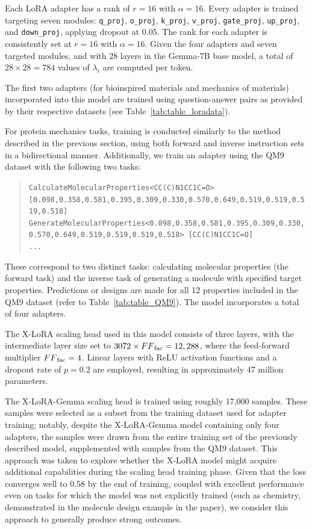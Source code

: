 Each LoRA adapter has a rank of $r=16$ with $\alpha=16$. Every adapter is trained targeting seven modules: \texttt{q\_proj}, \texttt{o\_proj}, \texttt{k\_proj}, \texttt{v\_proj}, \texttt{gate\_proj}, \texttt{up\_proj}, and \texttt{down\_proj}, applying dropout at 0.05. The rank for each adapter is consistently set at $r=16$ with $\alpha=16$. Given the four adapters and seven targeted modules, and with 28 layers in the Gemma-7B base model, a total of $28 \times 28 = 784$ values of $\lambda_i$ are computed per token.

The first two adapters (for bioinspired materials and mechanics of materials) incorporated into this model are trained using question-answer pairs as provided by their respective datasets (see Table~\ref{tab:table_loradata}).

For protein mechanics tasks, training is conducted similarly to the method described in the previous section, using both forward and inverse instruction sets in a bidirectional manner. Additionally, we train an adapter using the QM9 dataset with the following two tasks:

\begin{quote}
\tiny {\texttt{CalculateMolecularProperties<CC(C)N1CC1C=O> [0.098,0.358,0.581,0.395,0.309,0.330,0.570,0.649,0.519,0.519,0.519,0.518]\\
GenerateMolecularProperties<0.098,0.358,0.581,0.395,0.309,0.330,0.570,0.649,0.519,0.519,0.519,0.518> [CC(C)N1CC1C=O]\\ 
...
}}
\end{quote}

These correspond to two distinct tasks: calculating molecular properties (the forward task) and the inverse task of generating a molecule with specified target properties. Predictions or designs are made for all 12 properties included in the QM9 dataset (refer to Table~\ref{tab:table_QM9}).  
The model incorporates a total of four adapters.

The X-LoRA scaling head used in this model consists of three layers, with the intermediate layer size set to $3072 \times {FF}_{\rm fac} = 12,288$, where the feed-forward multiplier ${FF}_{\rm fac} = 4$. Linear layers with ReLU activation functions and a dropout rate of $p = 0.2$ are employed, resulting in approximately 47 million parameters.

The X-LoRA-Gemma scaling head is trained using roughly 17,000 samples. These samples were selected as a subset from the training dataset used for adapter training; notably, despite the X-LoRA-Gemma model containing only four adapters, the samples were drawn from the entire training set of the previously described model, supplemented with samples from the QM9 dataset. This approach was taken to explore whether the X-LoRA model might acquire additional capabilities during the scaling head training phase. Given that the loss converges well to 0.58 by the end of training, coupled with excellent performance even on tasks for which the model was not explicitly trained (such as chemistry, demonstrated in the molecule design example in the paper), we consider this approach to generally produce strong outcomes.

